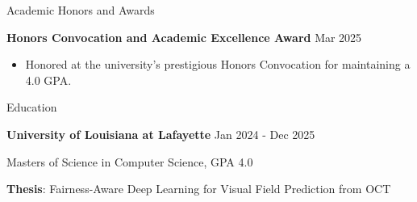 \documentclass{resume}
\begin{document}
\vspace{-5pt}
\begin{rSection}{Academic Honors and Awards}

{\bf Honors Convocation and Academic Excellence Award} \hfill Mar 2025

\begin{itemize}
\item Honored at the university's prestigious Honors Convocation for maintaining a 4.0 GPA.
\end{itemize}

\end{rSection}

\vspace{-6pt}
\begin{rSection}{Education}

{\bf University of Louisiana at Lafayette} \hfill Jan 2024 - Dec 2025

Masters of Science in Computer Science, GPA 4.0

\textbf{Thesis}: Fairness-Aware Deep Learning for Visual Field Prediction from OCT

\end{rSection}
\end{document}

